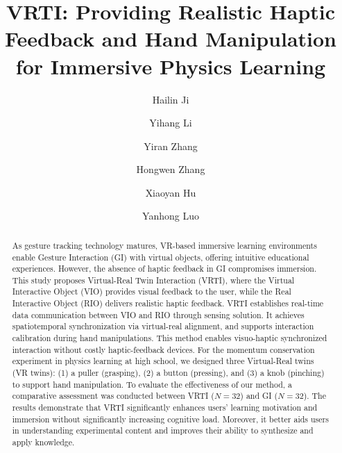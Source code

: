 \documentclass[runningheads]{llncs}
\begin{document}
\title{VRTI: Providing Realistic Haptic Feedback and Hand Manipulation for Immersive Physics Learning}

\author{Hailin Ji \and 
Yihang Li \and 
Yiran Zhang \and 
Hongwen Zhang \and 
Xiaoyan Hu \and 
Yanhong Luo}
 


\maketitle

\begin{abstract}
As gesture tracking technology matures, VR-based immersive learning environments enable Gesture Interaction (GI) with virtual objects, offering intuitive educational experiences. However, the absence of haptic feedback in GI compromises immersion. This study proposes Virtual-Real Twin Interaction (VRTI), where the Virtual Interactive Object (VIO) provides visual feedback to the user, while the Real Interactive Object (RIO) delivers realistic haptic feedback. VRTI establishes real-time data communication between VIO and RIO through sensing solution. It achieves spatiotemporal synchronization via virtual-real alignment, and supports interaction calibration during hand manipulations. This method enables visuo-haptic synchronized interaction without costly haptic-feedback devices. For the momentum conservation experiment in physics learning at high school, we designed three Virtual-Real twins (VR twins): (1) a puller (grasping), (2) a button (pressing), and (3) a knob (pinching) to support hand manipulation. To evaluate the effectiveness of our method, a comparative assessment was conducted between VRTI ($N=32$) and GI ($N=32$). The results demonstrate that VRTI significantly enhances users' learning motivation and immersion without significantly increasing cognitive load. Moreover, it better aids users in understanding experimental content and improves their ability to synthesize and apply knowledge.

\end{abstract}


\end{document}
